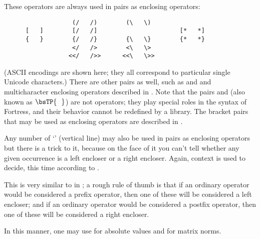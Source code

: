 These operators are always used in pairs as enclosing operators:
\begin{verbatim}
                   (/   /)        (\   \)
      [   ]        [/   /]                       [*   *]
      {   }        {/   /}        {\   \}        {*   *}
                   </   />        <\   \>
                  <</   />>      <<\   \>>
\end{verbatim}
(ASCII encodings are shown here; they all correspond to particular single
Unicode characters.)
There are other pairs as well, such as \txt{$\lfloor$~~$\rfloor$} and
\txt{$\lceil$~~$\rceil$} and multicharacter enclosing operators described
in .
Note that the pairs \txt{(~~)} and  (also
known as $\bsTP{~~}$) are not operators; they play special roles in the
syntax of Fortress, and their behavior cannot be redefined by a library.
The bracket pairs that may be used as enclosing operators are described in
.


Any number of `\txt{|}' (vertical line) may also be used in pairs as
enclosing operators but there is a trick to it,
because on the face of it you can't tell whether
any given occurrence is a left encloser or a right encloser.  Again, context
is used to decide, this time according to .

This is very similar to  in ;
a rough rule of thumb is that if an ordinary operator would be considered
a prefix operator, then one of these will be considered a left encloser;
and if an ordinary operator would be considered
a postfix operator, then one of these will be considered a right encloser.

In this manner, one may use \txt{|$\ldots$|} for absolute values and
\txt{||$\ldots$||} for matrix norms.
